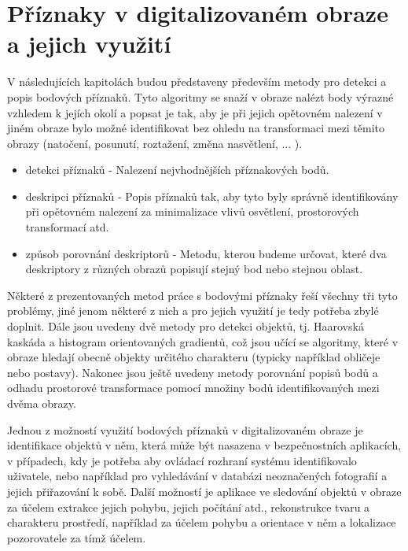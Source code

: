 
\chapter{Příznaky v digitalizovaném obraze a jejich využití}
\label{chap:slam}

V následujících kapitolách budou představeny především metody pro detekci a popis bodových příznaků. Tyto algoritmy se snaží v obraze nalézt body výrazné vzhledem k jejích okolí a popsat je tak, aby je při jejich opětovném nalezení v jiném obraze bylo možné identifikovat bez ohledu na transformaci mezi těmito obrazy (natočení, posunutí, roztažení, změna nasvětlení, ... ). %


\begin{itemize}
	\item{detekci příznaků} - Nalezení nejvhodnějších příznakových bodů.
	\item{deskripci příznaků} - Popis příznaků tak, aby tyto byly správně identifikovány při opětovném nalezení za minimalizace vlivů osvětlení, prostorových transformací atd.
	\item{způsob porovnání deskriptorů} - Metodu, kterou budeme určovat, které dva deskriptory z různých obrazů popisují stejný bod nebo stejnou oblast.
\end{itemize} 

Některé z prezentovaných metod práce s bodovými příznaky řeší všechny tři tyto problémy, jiné jenom některé z nich a pro jejich využití je tedy potřeba zbylé doplnit. Dále jsou uvedeny dvě metody pro detekci objektů, tj. Haarovská kaskáda a histogram orientovaných gradientů, což jsou učící se algoritmy, které v obraze hledají obecně objekty určitého charakteru (typicky například obličeje nebo postavy). Nakonec jsou ještě uvedeny metody porovnání popisů bodů a odhadu prostorové transformace pomocí množiny bodů identifikovaných mezi dvěma obrazy. 

Jednou z možností využití bodových příznaků v digitalizovaném obraze je identifikace objektů v něm, která může být nasazena v bezpečnostních aplikacích, v případech, kdy je potřeba aby ovládací rozhraní systému identifikovalo uživatele, nebo například pro vyhledávání v databázi neoznačených fotografií a jejich přiřazování k sobě. Další možností je aplikace ve sledování objektů v obraze za účelem extrakce jejich pohybu, jejich počítání atd., rekonstrukce tvaru a charakteru prostředí, například za účelem pohybu a orientace v něm a lokalizace pozorovatele za tímž účelem. 

